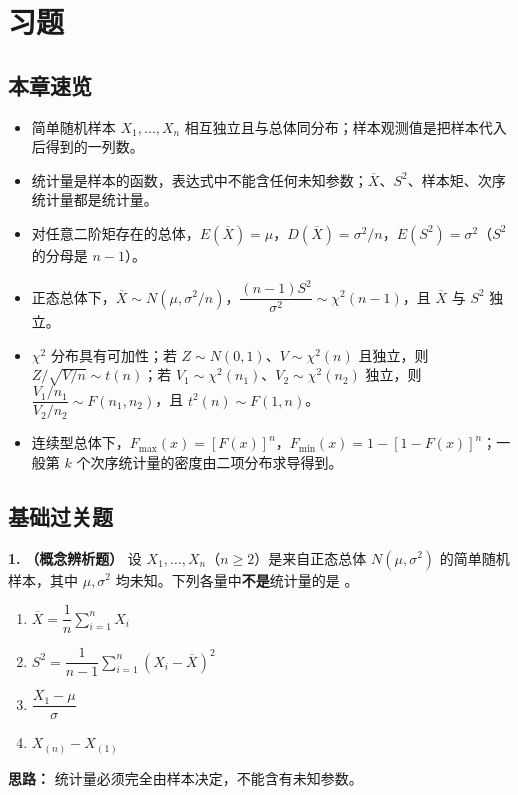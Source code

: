 \section{习题}

\subsection{本章速览}
\begin{itemize}
    \item 简单随机样本 $X_1,\ldots,X_n$ 相互独立且与总体同分布；样本观测值是把样本代入后得到的一列数。
    \item 统计量是样本的函数，表达式中不能含任何未知参数；$\overline{X}$、$S^2$、样本矩、次序统计量都是统计量。
    \item 对任意二阶矩存在的总体，$E(\overline{X})=\mu$，$D(\overline{X})=\sigma^2/n$，$E(S^2)=\sigma^2$（$S^2$ 的分母是 $n-1$）。
    \item 正态总体下，$\overline{X}\sim N(\mu,\sigma^2/n)$，$\dfrac{(n-1)S^2}{\sigma^2}\sim\chi^2(n-1)$，且 $\overline{X}$ 与 $S^2$ 独立。
    \item $\chi^2$ 分布具有可加性；若 $Z\sim N(0,1)$、$V\sim\chi^2(n)$ 且独立，则 $Z/\sqrt{V/n}\sim t(n)$；若 $V_1\sim\chi^2(n_1)$、$V_2\sim\chi^2(n_2)$ 独立，则 $\dfrac{V_1/n_1}{V_2/n_2}\sim F(n_1,n_2)$，且 $t^2(n)\sim F(1,n)$。
    \item 连续型总体下，$F_{\max}(x)=[F(x)]^n$，$F_{\min}(x)=1-[1-F(x)]^n$；一般第 $k$ 个次序统计量的密度由二项分布求导得到。
\end{itemize}

\subsection{基础过关题}

\textbf{1.} \textbf{（概念辨析题）} 设 $X_1,\ldots,X_n$（$n\geq 2$）是来自正态总体 $N(\mu,\sigma^2)$ 的简单随机样本，其中 $\mu,\sigma^2$ 均未知。下列各量中\textbf{不是}统计量的是 \underline{\qquad}。
\begin{enumerate}[label=(\Alph*)]
    \item $\overline{X}=\dfrac{1}{n}\sum_{i=1}^{n}X_i$
    \item $S^2=\dfrac{1}{n-1}\sum_{i=1}^{n}(X_i-\overline{X})^2$
    \item $\dfrac{X_1-\mu}{\sigma}$
    \item $X_{(n)}-X_{(1)}$
\end{enumerate}

\ifshowsolutions%
\textbf{思路：} 统计量必须完全由样本决定，不能含有未知参数。

